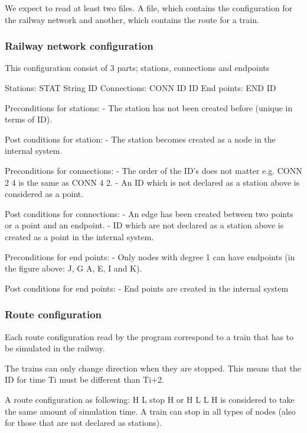 \documentclass[10pt,a4paper]{article}
\begin{document}
We expect to read at least two files. A file, which contains the configuration for the railway network and another, which contains the route for a train.  
 
\subsubsection{Railway network configuration}
 
This configuration consist of 3 parts; stations, connections and endpoints
 
Stations:       	STAT String ID
Connections:  CONN ID ID
End points:  	END ID
 
Preconditions for stations:
-          The station has not been created before (unique in terms of ID).
 
Post conditions for station:
-          The station becomes created as a node in the internal system.
 
Preconditions for connections:
-          The order of the ID’s does not matter e.g. CONN 2 4 is the same as CONN 4 2.
-          An ID which is not declared as a station above is considered as a point.
 
Post conditions for connections:
-          An edge has been created between two points or a point and an endpoint.
-          ID which are not declared as a station above is created as a point in the internal system.
 
Preconditions for end points:
-          Only nodes with degree 1 can have endpoints (in the figure above: J, G A, E, I and K).
 
Post conditions for end points:
-          End points are created in the internal system
 
\subsubsection{Route configuration}
 
Each route configuration read by the program correspond to a train that has to be simulated in the railway.
 
The trains can only change direction when they are stopped. This means that the ID for time Ti must be different than Ti+2.
 
A route configuration as following: H L stop H or H L L H is considered to take the same amount of simulation time. A train can stop in all types of nodes (also for those that are not declared as stations).
\end{document}
